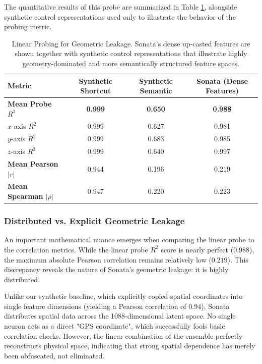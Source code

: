 \documentclass[11pt, a4paper]{article}
\begin{document}
The quantitative results of this probe are summarized in Table \ref{tab:sonata_r2_results}, alongside synthetic control representations used only to illustrate the behavior of the probing metric.

\begin{table}[htpb]
    \centering
    \begin{tabular}{@{}lccc@{}}
        \toprule
        \textbf{Metric} & \textbf{Synthetic Shortcut} & \textbf{Synthetic Semantic} & \textbf{Sonata (Dense Features)} \\ \midrule
        \textbf{Mean Probe $R^2$} & \textbf{0.999} & \textbf{0.650} & \textbf{0.988} \\
        \hspace{3mm} $x$-axis $R^2$ & 0.999 & 0.627 & 0.981 \\
        \hspace{3mm} $y$-axis $R^2$ & 0.999 & 0.683 & 0.985 \\
        \hspace{3mm} $z$-axis $R^2$ & 0.999 & 0.640 & 0.997 \\ \midrule
        \textbf{Mean Pearson $|r|$} & 0.944 & 0.196 & 0.219 \\
        \textbf{Mean Spearman $|\rho|$} & 0.947 & 0.220 & 0.223 \\ \bottomrule
    \end{tabular}
    
    \caption{Linear Probing for Geometric Leakage. Sonata's dense up-casted features are shown together with synthetic control representations that illustrate highly geometry-dominated and more semantically structured feature spaces.}
    \label{tab:sonata_r2_results}
\end{table}

\subsubsection*{Distributed vs. Explicit Geometric Leakage}

An important mathematical nuance emerges when comparing the linear probe to the correlation metrics. While the linear probe $R^2$ score is nearly perfect ($0.988$), the maximum absolute Pearson correlation remains relatively low ($0.219$). This discrepancy reveals the nature of Sonata's geometric leakage: it is highly distributed. 

Unlike our synthetic baseline, which explicitly copied spatial coordinates into single feature dimensions (yielding a Pearson correlation of $0.94$), Sonata distributes spatial data across the 1088-dimensional latent space. No single neuron acts as a direct "GPS coordinate", which successfully fools basic correlation checks. However, the linear combination of the ensemble perfectly reconstructs physical space, indicating that strong spatial dependence has merely been obfuscated, not eliminated.
\end{document}
